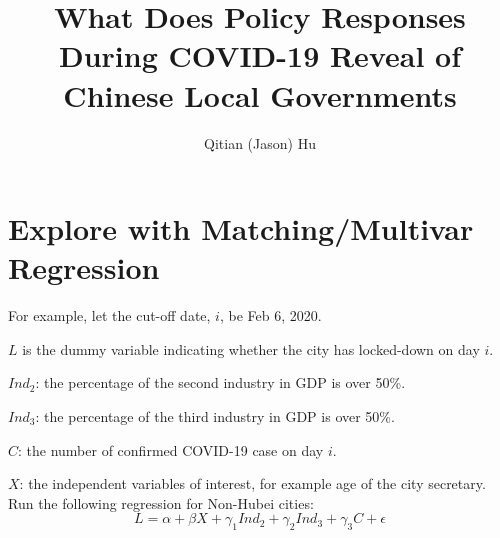 \documentclass{article}
\title{What Does Policy Responses During COVID-19 Reveal of Chinese Local Governments}
\author{Qitian (Jason) Hu}
\begin{document}
\maketitle %

\section{Explore with Matching/Multivar Regression}

For example, let the cut-off date, $i$, be Feb 6, 2020. 

$L$ is the dummy variable indicating whether the city has locked-down on day $i$.

$Ind_2$: the percentage of the second industry in GDP is over 50\%.

$Ind_3$: the percentage of the third industry in GDP is over 50\%.

$C$: the number of confirmed COVID-19 case on day $i$. 

$X$: the independent variables of interest, for example age of the city secretary.
\\
Run the following regression for Non-Hubei cities:
\begin{equation}
  L = \alpha + \beta X + \gamma_1 Ind_2 + \gamma_2 Ind_3 + \gamma_3 C + \epsilon  
\end{equation}
\end{document}
